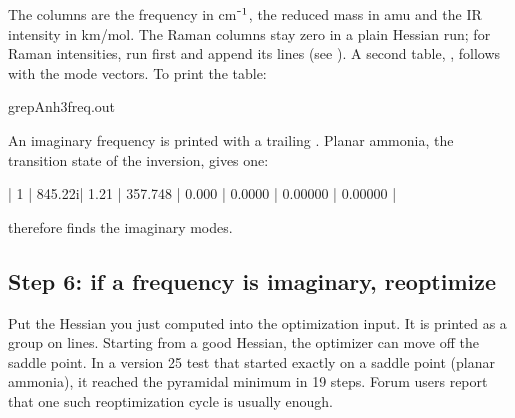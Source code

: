 \documentclass[letterpaper,10pt,english,openany,oneside]{sphinxmanual}
\begin{document}
\sphinxAtStartPar
The columns are the frequency in cm⁻\(\sp{\text{1}}\), the reduced mass in amu and the IR intensity in km/mol. The Raman columns
stay zero in a plain Hessian run; for Raman intensities, run  first and append its  lines (see
{\hyperref[\detokenize{start/input-syntax::doc}]{}}). A second table, , follows with the mode vectors. To print the table:



\begin{sphinxVerbatim}[commandchars=\\\{\}]
grep\PYGZhy{}Anh3\PYGZus{}freq.out
\end{sphinxVerbatim}



\sphinxAtStartPar
An imaginary frequency is printed with a trailing . Planar ammonia, the transition state of the inversion,
gives one:

\begin{sphinxVerbatim}[commandchars=\\\{\}]
 |    1 |  845.22i|   1.21 | 357.748 |   0.000 | 0.0000 |   0.00000 |   0.00000 |
\end{sphinxVerbatim}



\sphinxAtStartPar
{} therefore finds the imaginary modes.


\subsection{Step 6: if a frequency is imaginary, re\sphinxhyphen{}optimize}
\label{\detokenize{start/getting-started:step-6-if-a-frequency-is-imaginary-re-optimize}}
\sphinxAtStartPar
Put the Hessian you just computed into the optimization input. It is printed as a  group on  lines.
Starting from a good Hessian, the optimizer can move off the saddle point. In a version 25 test that started
exactly on a saddle point (planar ammonia), it reached the pyramidal minimum in 19 steps. Forum users report that
one such re\sphinxhyphen{}optimization cycle is usually enough.
\end{document}
